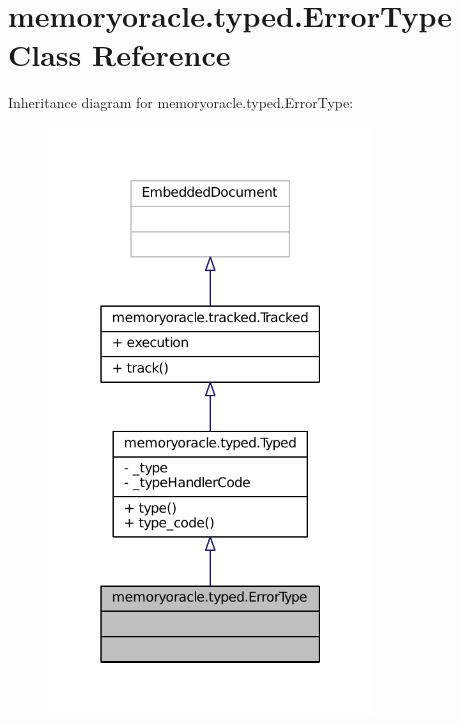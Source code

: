 \hypertarget{classmemoryoracle_1_1typed_1_1ErrorType}{}\section{memoryoracle.\+typed.\+Error\+Type Class Reference}
\label{classmemoryoracle_1_1typed_1_1ErrorType}


Inheritance diagram for memoryoracle.\+typed.\+Error\+Type\+:
\nopagebreak
\begin{figure}[H]
\begin{center}
\leavevmode
\includegraphics[width=244pt]{classmemoryoracle_1_1typed_1_1ErrorType__inherit__graph}
\end{center}
\end{figure}


